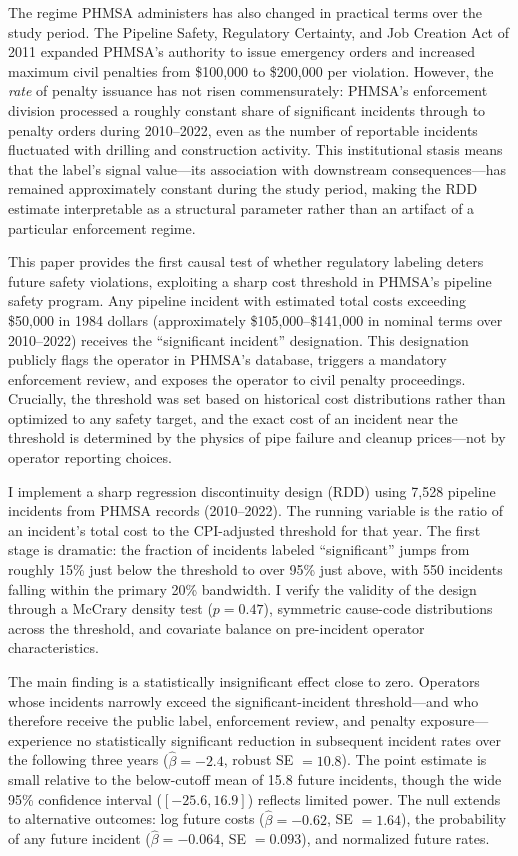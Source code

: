 \documentclass[12pt]{article}
\begin{document}
The regime PHMSA administers has also changed in practical terms over the study period. The Pipeline Safety, Regulatory Certainty, and Job Creation Act of 2011 expanded PHMSA's authority to issue emergency orders and increased maximum civil penalties from \$100,000 to \$200,000 per violation. However, the \textit{rate} of penalty issuance has not risen commensurately: PHMSA's enforcement division processed a roughly constant share of significant incidents through to penalty orders during 2010--2022, even as the number of reportable incidents fluctuated with drilling and construction activity. This institutional stasis means that the label's signal value---its association with downstream consequences---has remained approximately constant during the study period, making the RDD estimate interpretable as a structural parameter rather than an artifact of a particular enforcement regime.

This paper provides the first causal test of whether regulatory labeling deters future safety violations, exploiting a sharp cost threshold in PHMSA's pipeline safety program. Any pipeline incident with estimated total costs exceeding \$50,000 in 1984 dollars (approximately \$105,000--\$141,000 in nominal terms over 2010--2022) receives the ``significant incident'' designation. This designation publicly flags the operator in PHMSA's database, triggers a mandatory enforcement review, and exposes the operator to civil penalty proceedings. Crucially, the threshold was set based on historical cost distributions rather than optimized to any safety target, and the exact cost of an incident near the threshold is determined by the physics of pipe failure and cleanup prices---not by operator reporting choices.

I implement a sharp regression discontinuity design (RDD) using 7,528 pipeline incidents from PHMSA records (2010--2022). The running variable is the ratio of an incident's total cost to the CPI-adjusted threshold for that year. The first stage is dramatic: the fraction of incidents labeled ``significant'' jumps from roughly 15\% just below the threshold to over 95\% just above, with 550 incidents falling within the primary 20\% bandwidth. I verify the validity of the design through a McCrary density test ($p = 0.47$), symmetric cause-code distributions across the threshold, and covariate balance on pre-incident operator characteristics.

The main finding is a statistically insignificant effect close to zero. Operators whose incidents narrowly exceed the significant-incident threshold---and who therefore receive the public label, enforcement review, and penalty exposure---experience no statistically significant reduction in subsequent incident rates over the following three years ($\hat{\beta} = -2.4$, robust SE $= 10.8$). The point estimate is small relative to the below-cutoff mean of 15.8 future incidents, though the wide 95\% confidence interval ($[-25.6, 16.9]$) reflects limited power. The null extends to alternative outcomes: log future costs ($\hat{\beta} = -0.62$, SE $= 1.64$), the probability of any future incident ($\hat{\beta} = -0.064$, SE $= 0.093$), and normalized future rates.
\end{document}
